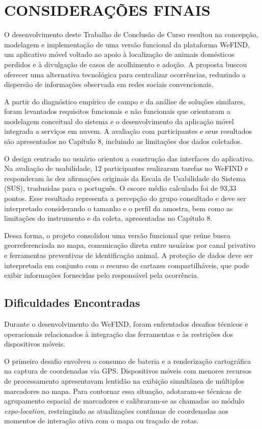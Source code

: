 \section{CONSIDERAÇÕES FINAIS}

O desenvolvimento deste Trabalho de Conclusão de Curso resultou na concepção, modelagem e implementação de uma versão funcional da plataforma WeFIND, um aplicativo móvel voltado ao apoio à localização de animais domésticos perdidos e à divulgação de casos de acolhimento e adoção. A proposta buscou oferecer uma alternativa tecnológica para centralizar ocorrências, reduzindo a dispersão de informações observada em redes sociais convencionais.

A partir do diagnóstico empírico de campo e da análise de soluções similares, foram levantados requisitos funcionais e não funcionais que orientaram a modelagem conceitual do sistema e o desenvolvimento da aplicação móvel integrada a serviços em nuvem. A avaliação com participantes e seus resultados são apresentados no Capítulo 8, incluindo as limitações dos dados coletados.

O design centrado no usuário orientou a construção das interfaces do aplicativo. Na avaliação de usabilidade, 12 participantes realizaram tarefas no WeFIND e responderam às dez afirmações originais da Escala de Usabilidade do Sistema (SUS), traduzidas para o português. O escore médio calculado foi de 93,33 pontos. Esse resultado representa a percepção do grupo consultado e deve ser interpretado considerando o tamanho e o perfil da amostra, bem como as limitações do instrumento e da coleta, apresentadas no Capítulo 8.

Dessa forma, o projeto consolidou uma versão funcional que reúne busca georreferenciada no mapa, comunicação direta entre usuários por canal privativo e ferramentas preventivas de identificação animal. A proteção de dados deve ser interpretada em conjunto com o recurso de cartazes compartilháveis, que pode exibir informações fornecidas pelo responsável pela ocorrência.


\subsection{Dificuldades Encontradas}

Durante o desenvolvimento do WeFIND, foram enfrentados desafios técnicos e operacionais relacionados à integração das ferramentas e às restrições dos dispositivos móveis.

O primeiro desafio envolveu o consumo de bateria e a renderização cartográfica na captura de coordenadas via GPS. Dispositivos móveis com menores recursos de processamento apresentavam lentidão na exibição simultânea de múltiplos marcadores no mapa. Para contornar essa situação, adotaram-se técnicas de agrupamento espacial de marcadores e calibraram-se as chamadas ao módulo \textit{expo-location}, restringindo as atualizações contínuas de coordenadas aos momentos de interação ativa com o mapa ou traçado de rotas.


